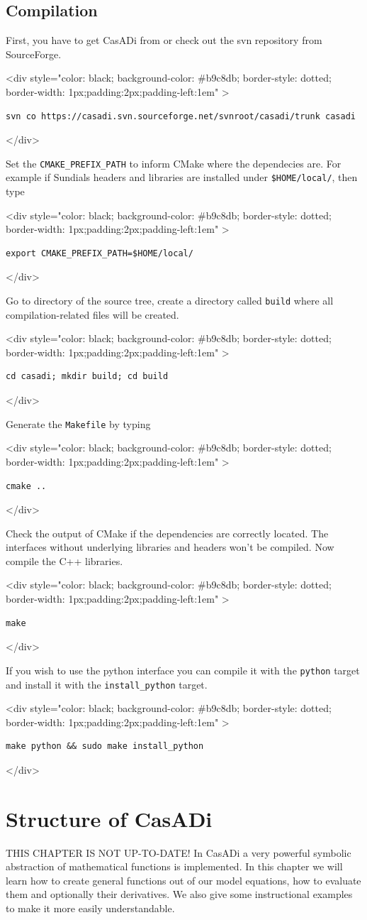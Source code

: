 \documentclass[a4paper,12pt]{book}
\newcommand{\codebegin}{
\begin{rawhtml}
<div style="color: black; background-color: \#b9c8db;  border-style: dotted; border-width: 1px;padding:2px;padding-left:1em" >
\end{rawhtml}
}
\newcommand{\codeend}{
\begin{rawhtml}
</div>
\end{rawhtml}
}
\newcommand{\codebegin}{

}
\newcommand{\codeend}{

}
\begin{document}
\section{Compilation}
First, you have to get CasADi from  or check out the svn repository from SourceForge.
\par
\codebegin
\begin{verbatim}
svn co https://casadi.svn.sourceforge.net/svnroot/casadi/trunk casadi
\end{verbatim}
\codeend
Set the \texttt{CMAKE\_PREFIX\_PATH} to inform CMake where the dependecies are. 
For example if Sundials headers and libraries are installed under \texttt{\$HOME/local/}, then type
\par
\codebegin{
\begin{verbatim}
export CMAKE_PREFIX_PATH=$HOME/local/
\end{verbatim}
\codeend
\par
Go to directory of the source tree, create a directory called \texttt{build} where all compilation-related files will be created.
\par
\codebegin
\begin{verbatim}
cd casadi; mkdir build; cd build
\end{verbatim}
\codeend
Generate the \texttt{Makefile} by typing
\par
\codebegin
\begin{verbatim}
cmake ..
\end{verbatim}
\codeend
Check the output of CMake if the dependencies are correctly located. The interfaces without underlying libraries and headers won't be compiled.
Now compile the C++ libraries.
\par
\codebegin
\begin{verbatim}
make
\end{verbatim}
\codeend
If you wish to use the python interface you can compile it with the \texttt{python} target and install it with the \texttt{install\_python} target.
\par
\codebegin
\begin{verbatim}
make python && sudo make install_python
\end{verbatim}
\codeend

\chapter{Structure of CasADi}
{\color{red}THIS CHAPTER IS NOT UP-TO-DATE!}
In CasADi a very powerful symbolic abstraction of mathematical functions is implemented.
In this chapter we will learn how to create general functions out of our model equations, 
how to evaluate them and optionally their derivatives. We also give some instructional
examples to make it more easily understandable.

}
\end{document}
